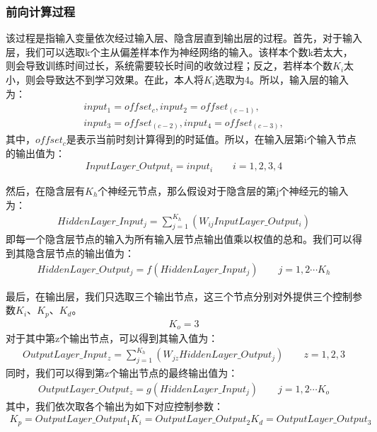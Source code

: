 \subsubsection{前向计算过程}
该过程是指输入变量依次经过输入层、隐含层直到输出层的过程。首先，对于输入层，我们可以选取k个主从偏差样本作为神经网络的输入。该样本个数k若太大，则会导致训练时间过长，系统需要较长时间的收敛过程；反之，若样本个数$K_{i}$太小，则会导致达不到学习效果\supercite{69}。在此，本人将$K_{i}$选取为4。所以，输入层的输入为：
\begin{align}
	input_{1} = offset_{c}, input_{2} = offset_{(c-1)}, \\
	input_{3} = offset_{(c-2)}, input_{4} = offset_{(c-3)}, 
\end{align}
其中，$offset_{c}$是表示当前时刻计算得到的时延值。所以，在输入层第i个输入节点的输出值为：
\begin{align}
	InputLayer\_Output_{i} = input_{i} \qquad i = 1, 2, 3, 4
\end{align}

然后，在隐含层有$K_{h}$个神经元节点，那么假设对于隐含层的第j个神经元的输入为：
\begin{align}
	HiddenLayer\_Input_{j} = \sum_{j=1}^{K_{h}}(W_{ij}InputLayer\_Output_{i})
\end{align}
即每一个隐含层节点的输入为所有输入层节点输出值乘以权值的总和。我们可以得到其隐含层节点的输出值为：
\begin{align}
	HiddenLayer\_Output_{j} = f(HiddenLayer\_Input_{j}) \qquad j = 1, 2 \cdots K_{h}
\end{align}

最后，在输出层，我们只选取三个输出节点，这三个节点分别对外提供三个控制参数$K_{i}$、$K_{p}$、$K_{d}$。
\begin{align}
K_{o} = 3
\end{align}
对于其中第z个输出节点，可以得到其输入值为：
\begin{align}
OutputLayer\_Input_{z} = \sum_{j=1}^{K_{h}}(W_{jz}HiddenLayer\_Output_{j}) \qquad z = 1, 2, 3
\end{align}
同时，我们可以得到第z个输出节点的最终输出值为：
\begin{align}
OutputLayer\_Output_{z} = g(HiddenLayer\_Input_{j}) \qquad j = 1, 2 \cdots K_{o}
\end{align}
其中，我们依次取各个输出为如下对应控制参数：
\begin{align}
K_{p} = OutputLayer\_Output_{1}
K_{i} = OutputLayer\_Output_{2}
K_{d} = OutputLayer\_Output_{3}
\end{align}

